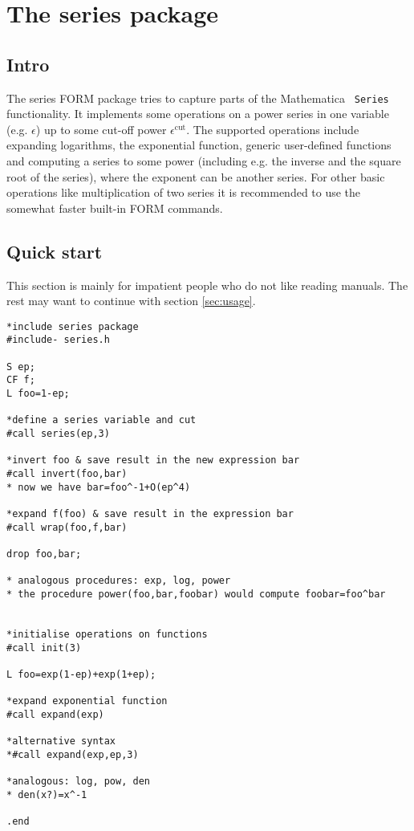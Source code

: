 \documentclass{article}
\begin{document}
\section{The series package}

\subsection{Intro}

The series FORM package tries to capture parts of the Mathematica {\tt
  Series} functionality. It implements some operations on a power
series in one variable
(e.g. $\epsilon$) up to some cut-off power $\epsilon^{\text{cut}}$. The
supported operations include expanding logarithms, the exponential
function, generic user-defined functions and
 computing a series to some power (including e.g. the inverse and
the square root of the series), where the exponent can be another
series. For other basic operations like multiplication of two series it
is recommended to use the somewhat faster built-in FORM commands.

\subsection{Quick start}
\label{sec:quick}

This section is mainly for impatient people who do not like reading
manuals. The rest may want to continue with section \ref{sec:usage}.

\begin{verbatim}
*include series package
#include- series.h

S ep;
CF f;
L foo=1-ep;

*define a series variable and cut
#call series(ep,3)

*invert foo & save result in the new expression bar
#call invert(foo,bar)
* now we have bar=foo^-1+O(ep^4)

*expand f(foo) & save result in the expression bar
#call wrap(foo,f,bar)

drop foo,bar;

* analogous procedures: exp, log, power
* the procedure power(foo,bar,foobar) would compute foobar=foo^bar


*initialise operations on functions
#call init(3)

L foo=exp(1-ep)+exp(1+ep);

*expand exponential function
#call expand(exp)

*alternative syntax
*#call expand(exp,ep,3)

*analogous: log, pow, den
* den(x?)=x^-1

.end
\end{verbatim}
\end{document}
